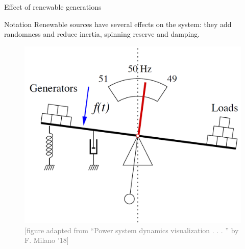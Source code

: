 \documentclass{beamer}
\begin{document}
\begin{frame}{Effect of renewable generations}
\begin{block}{Notation}
{\tiny Renewable sources have several effects on the system: they add randomness and reduce
inertia, spinning reserve and damping.}
\end{block}

        \begin{figure}
        \includegraphics[scale=0.2]{Figures/SystemInertia4.PNG}
        \caption{\textcolor{gray}{\tiny [figure adapted from “Power system dynamics visualization . . . ” by F. Milano ’18]}}
        \end{figure}

\end{frame}
\end{document}
